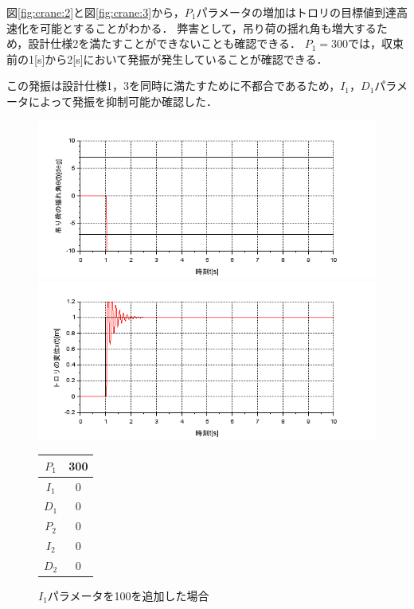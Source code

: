 \documentclass[dvipdfmx,titlepage,a4j]{jsarticle}  %
\begin{document}
図\ref{fig:crane:2}と図\ref{fig:crane:3}から，$P_1$パラメータの増加はトロリの目標値到達高速化を可能とすることがわかる．
弊害として，吊り荷の揺れ角も増大するため，設計仕様2を満たすことができないことも確認できる．
$P_1 = 300$では，収束前の1[s]から2[s]において発振が発生していることが確認できる．

この発振は設計仕様1，3を同時に満たすために不都合であるため，$I_1$，$D_1$パラメータによって発振を抑制可能か確認した．

\begin{figure}[H]
  \begin{minipage}{4.5cm}
    \centering
    \includegraphics[keepaspectratio, scale=0.35]{../graph/crane/ang-P1-300-I1-0-D1-0-P2-0-I2-0-D2-0.png}
  \end{minipage}
  \hfill
  \begin{minipage}{4.5cm}
    \centering
    \includegraphics[keepaspectratio, scale=0.35]{../graph/crane/po-P1-300-I1-0-D1-0-P2-0-I2-0-D2-0.png}
  \end{minipage}
  \hfill
  \begin{minipage}{3cm}
    \begin{center}
      \begin{tabular}{c|c}
        \hline
        $P_1$ & 300\\ \hline
        $I_1$ & 0\\ \hline
        $D_1$ & 0\\ \hline
        $P_2$ & 0\\ \hline
        $I_2$ & 0\\ \hline
        $D_2$ & 0\\
        \hline
      \end{tabular}
    \end{center}
  \end{minipage}
  \hfill
  \caption{$I_1$パラメータを100を追加した場合}
  \label{fig:crane:4}
\end{figure}
\end{document}
